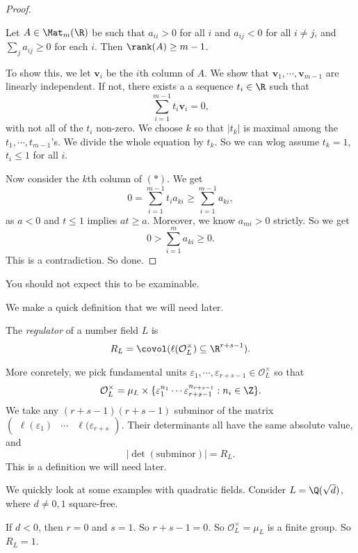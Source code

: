 \documentclass[a4paper]{article}
\begin{document}
\begin{proof}
  \begin{claim}
    Let $A \in \Mat_{m}(\R)$ be such that $a_{ii} > 0$ for all $i$ and $a_{ij} < 0$ for all $i\not= j$, and $\sum_j a_{ij} \geq 0$ for each $i$. Then $\rank(A) \geq m - 1$.
  \end{claim}

  To show this, we let $\mathbf{v}_i$ be the $i$th column of $A$. We show that $\mathbf{v}_1, \cdots, \mathbf{v}_{m - 1}$ are linearly independent. If not, there exists a a sequence $t_i \in \R$ such that
  \[
    \sum_{i = 1}^{m - 1} t_i \mathbf{v}_i = 0,\tag{$*$}
  \]
  with not all of the $t_i$ non-zero. We choose $k$ so that $|t_k|$ is maximal among the $t_1, \cdots, t_{m - 1}$'s. We divide the whole equation by $t_k$. So we can wlog assume $t_k = 1$, $t_i \leq 1$ for all $i$.

  Now consider the $k$th column of $(*)$. We get
  \[
    0 = \sum_{i = 1}^{m - 1} t_i a_{ki} \geq \sum_{i = 1}^{m - 1} a_{ki},
  \]
  as $a < 0$ and $t \leq 1$ implies $at \geq a$. Moreover, we know $a_{mi} > 0$ strictly. So we get
  \[
    0 > \sum_{i = 1}^m a_{ki} \geq 0.
  \]
  This is a contradiction. So done.
\end{proof}
You should not expect this to be examinable.

We make a quick definition that we will need later.
\begin{defi}[Regulator]
  The \emph{regulator} of a number field $L$ is
  \[
    R_L = \covol (\ell(\mathcal{O}_L^\times) \subseteq \R^{r + s - 1}).
  \]
\end{defi}
More conretely, we pick fundamental units $\varepsilon_1, \cdots, \varepsilon_{r + s - 1} \in \mathcal{O}_L^\times$ so that
\[
  \mathcal{O}_L^\times = \mu_L \times \{\varepsilon_1^{n_1} \cdots \varepsilon_{r + s - 1}^{n_{r + s - 1}} : n_i \in \Z\}.
\]
We take any $(r + s - 1)(r + s - 1)$ subminor of the matrix $\begin{pmatrix} \ell(\varepsilon_1) & \cdots & \ell(\varepsilon_{r + s}\end{pmatrix}$. Their determinants all have the same absolute value, and
\[
  |\det(\text{subminor})| = R_L.
\]
This is a definition we will need later.

We quickly look at some examples with quadratic fields. Consider $L = \Q(\sqrt{d})$, where $d \not= 0, 1$ square-free.
\begin{eg}
  If $d < 0$, then $r = 0$ and $s = 1$. So $r + s - 1 = 0$. So $\mathcal{O}_L^\times = \mu_L$ is a finite group. So $R_L = 1$.
\end{eg}
\end{document}
